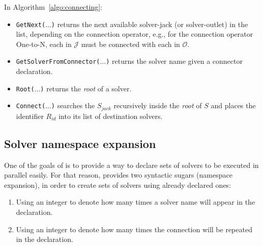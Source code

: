 In Algorithm~\ref{algo:connecting}:
\begin{itemize}
\item \texttt{GetNext($\dots$)} returns the next available solver-jack (or solver-outlet) in the list, depending on the connection operator, e.g., for the connection operator One-to-N, each \jack{} in $\mathcal{J}$ must be connected with each \outlet{} in $\mathcal{O}$.
\item \texttt{GetSolverFromConnector($\dots$)} returns the solver name given a connector declaration.
\item \texttt{Root($\dots$)} returns the {\it root} \cm{} of a solver.
\item \texttt{Connect($\dots$)} %
searches the \om{} $S_{jack}$ recursively inside the {\it root} \cm{} of $S$ and places the identifier $R_{id}$ into its list of destination solvers.
\end{itemize}


\subsection{Solver namespace expansion}

One of the goals of \posl{} is to provide a way to declare sets of solvers to be executed in parallel easily. For that reason, \posl{} provides two syntactic sugars (namespace expansion), in order to create sets of solvers using already declared ones:
\begin{enumerate}
\item Using an integer to denote how many times a solver name will appear in the declaration.
\item Using an integer to denote how many times the connection will be repeated in the declaration.
\end{enumerate}

